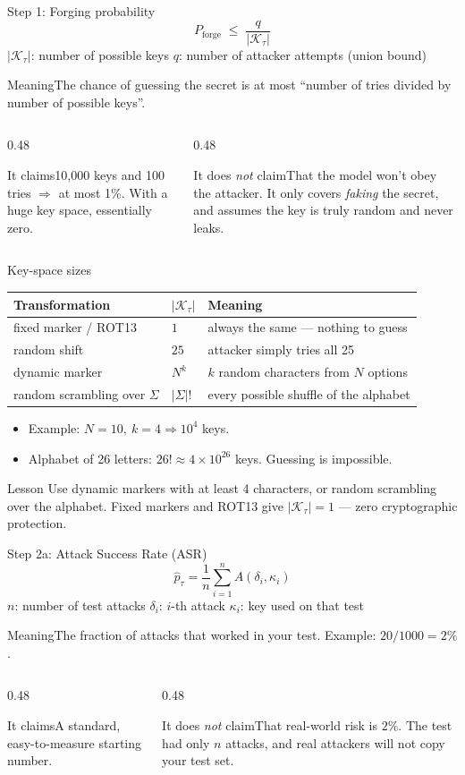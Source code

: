 \documentclass[aspectratio=169,11pt]{beamer}
\newcommand{\K}{\mathcal{K}_\tau}
\newcommand{\phat}{\hat p_\tau}
\newcommand{\plain}[1]{\begin{block}{Meaning}#1\end{block}}
\newcommand{\claims}[2]{%
  \begin{columns}[T]
    \begin{column}{0.48\textwidth}
      \begin{exampleblock}{It claims}#1\end{exampleblock}
    \end{column}
    \begin{column}{0.48\textwidth}
      \begin{alertblock}{It does \emph{not} claim}#2\end{alertblock}
    \end{column}
  \end{columns}}
\begin{document}
\begin{frame}{Step 1: Forging probability}
  \[
    P_{\text{forge}} \;\le\; \frac{q}{|\K|}
  \]
  \small
  $|\K|$: number of possible keys \quad $q$: number of attacker attempts (union bound)
  \vspace{0.3em}
  \plain{The chance of guessing the secret is at most ``number of tries divided by number of possible keys''.}
  \claims{10{,}000 keys and 100 tries $\Rightarrow$ at most 1\%. With a huge key space, essentially zero.}
  {That the model won't obey the attacker. It only covers \emph{faking} the secret, and assumes the key is truly random and never leaks.}
\end{frame}

\begin{frame}{Key-space sizes}
  \centering
  \begin{tabular}{@{}lll@{}}
    \toprule
    \textbf{Transformation} & $|\K|$ & \textbf{Meaning} \\
    \midrule
    fixed marker / ROT13 & $1$ & always the same --- nothing to guess \\
    random shift & $25$ & attacker simply tries all 25 \\
    dynamic marker & $N^k$ & $k$ random characters from $N$ options \\
    random scrambling over $\Sigma$ & $|\Sigma|!$ & every possible shuffle of the alphabet \\
    \bottomrule
  \end{tabular}
  \vspace{1em}
  \begin{itemize}
    \item Example: $N=10,\ k=4 \Rightarrow 10^4$ keys.
    \item Alphabet of 26 letters: $26! \approx 4\times 10^{26}$ keys. Guessing is impossible.
  \end{itemize}
  \begin{alertblock}{Lesson}
    Use dynamic markers with at least 4 characters, or random scrambling over the alphabet. Fixed markers and ROT13 give $|\K|=1$ --- zero cryptographic protection.
  \end{alertblock}
\end{frame}

\begin{frame}{Step 2a: Attack Success Rate (ASR)}
  \[
    \phat = \frac{1}{n} \sum_{i=1}^n A(\delta_i, \kappa_i)
  \]
  \small
  $n$: number of test attacks \quad $\delta_i$: $i$-th attack \quad $\kappa_i$: key used on that test
  \vspace{0.3em}
  \plain{The fraction of attacks that worked in your test. Example: $20/1000 = 2\%$.}
  \claims{A standard, easy-to-measure starting number.}
  {That real-world risk is $2\%$. The test had only $n$ attacks, and real attackers will not copy your test set.}
\end{frame}
\end{document}
